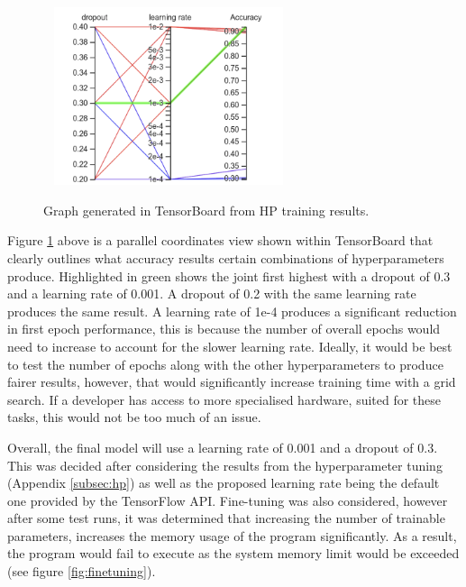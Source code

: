 \documentclass[12pt,a4paper]{report}
\begin{document}
\begin{figure}[h]\
    \centering
    \includegraphics[width=0.6\textwidth]{cross_graph.png}
    \caption{Graph generated in TensorBoard from HP training results.}
    \label{fig:cross}
\end{figure}

\break

Figure \ref{fig:cross} above is a parallel coordinates view shown within TensorBoard that clearly outlines what accuracy 
results 
certain combinations of hyperparameters produce. Highlighted in green shows the joint first highest with a dropout of 
0.3 and a learning rate of 0.001. A dropout of 0.2 with the same learning rate produces the same result. A learning rate
of 1e-4 produces a significant reduction in first epoch performance, this is because the number of overall epochs would
need to increase to account for the slower learning rate. Ideally, it would be best to test the number of epochs along 
with the other 
hyperparameters to produce fairer results, however, that would significantly increase training time with a grid search. 
If a developer has access to more specialised hardware, suited for these tasks, this would not be too much of
an issue.

\par

Overall, the final model will use a learning rate of 0.001 and a dropout of 0.3. This was decided after considering the 
results from the hyperparameter tuning (Appendix \ref{subsec:hp}) as well as the proposed learning rate being the 
default one provided by the TensorFlow API. Fine-tuning was also considered, however after some test runs, it was
determined that increasing the number of trainable parameters, increases the memory usage of the program significantly.
As a result, the program would fail to execute as the system memory limit would be exceeded 
(see figure \ref{fig:finetuning}).
\end{document}
